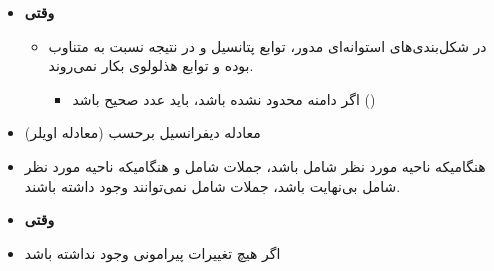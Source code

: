 \begin{ELunit}

\begin{itemize}
\tightlist
\item
  \textbf{وقتی }

  \begin{itemize}
  \tightlist
  \item
    در شکل‌بندی‌های استوانه‌ای مدور، توابع پتانسیل و در نتیجه \ELim{\Phi(\phi)} نسبت به \ELim{\phi} متناوب بوده و توابع هذلولوی بکار نمی‌روند.

    \begin{itemize}
    \tightlist
    \item
      اگر دامنه \ELim{\phi} محدود نشده باشد،  باید عدد صحیح باشد ()
    \end{itemize}
  \end{itemize}
\end{itemize}


\begin{itemize}
\tightlist
\item
  معادله دیفرانسیل برحسب  (معادله اویلر)
\end{itemize}


\end{ELunit}

\begin{ELimportant}{}


\end{ELimportant}

\begin{ELunit}

\begin{itemize}
\item
  هنگامیکه ناحیه مورد نظر شامل  باشد، جملات شامل  و هنگامیکه ناحیه مورد نظر شامل بی‌نهایت باشد، جملات شامل  نمی‌توانند وجود داشته باشند.
\item
  \textbf{وقتی }
\end{itemize}


\begin{itemize}
\tightlist
\item
  اگر هیچ تغییرات پیرامونی وجود نداشته باشد
\end{itemize}


\end{ELunit}


